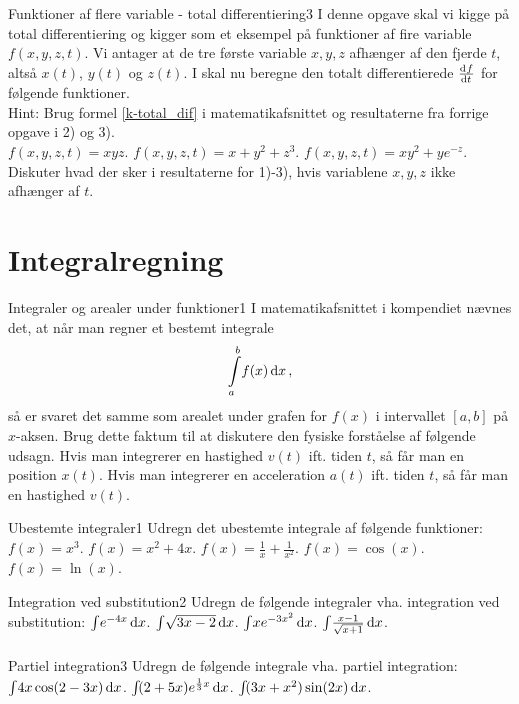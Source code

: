 \begin{opgave}{Funktioner af flere variable - total differentiering}{3}
	I denne opgave skal vi kigge på total differentiering og kigger som et eksempel på funktioner af fire variable $f(x,y,z,t)$. Vi antager at de tre første variable $x,y,z$ afhænger af den fjerde $t$, altså $x(t)$, $y(t)$ og $z(t)$. I skal nu beregne den totalt differentierede $\dif{t}{f}$ for følgende funktioner.\\
	Hint: Brug formel \eqref{k-total_dif} i matematikafsnittet og resultaterne fra forrige opgave i 2) og 3).\\
	\opg $f(x,y,z,t) = xyz.$ 
	\opg $f(x,y,z,t) = x +y^2 + z^3.$
	\opg $f(x,y,z,t) = x y^2 +  ye^{-z}.$
	\opg Diskuter hvad der sker i resultaterne for 1)-3), hvis variablene $x,y,z$ ikke afhænger af $t$. \\
\end{opgave}
\section*{Integralregning}
\begin{opgave}{Integraler og arealer under funktioner}{1}
I matematikafsnittet i kompendiet nævnes det, at når man regner et bestemt integrale
\begin{equation*}
\integral{f(x)}{x}{a}{b} \, ,
\end{equation*}
så er svaret det samme som arealet under grafen for $f(x)$ i intervallet $[a,b]$ på $x$-aksen. Brug dette faktum til at diskutere den fysiske forståelse af følgende udsagn.
\opg Hvis man integrerer en hastighed $v(t)$ ift. tiden $t$, så får man en position $x(t)$.
\opg Hvis man integrerer en acceleration $a(t)$ ift. tiden $t$, så får man en hastighed $v(t)$. \\
\end{opgave}
\begin{opgave}{Ubestemte integraler}{1}
	Udregn det ubestemte integrale af følgende funktioner:
	\opg $f(x) = x^3$.
	\opg $f(x) = x^2 + 4x$.
	\opg $f(x) = \frac{1}{x} + \frac{1}{x^2}$.
	\opg $f(x) = \cos (x)$.
	\opg $f(x) = \ln (x)$.
\end{opgave}
\begin{opgave}{Integration ved substitution}{2}
	Udregn de følgende integraler vha. integration ved substitution:
	\opg $\integral{e^{-4x}}{x}{}{}$.
	\opg $\integral{\sqrt{3x-2}}{x}{}{}$.
	\opg $\integral{xe^{-3x^2}}{x}{}{}$.
	\opg $\integral{\frac{x-1}{\sqrt{x+1}}}{x}{}{}$.
\end{opgave}
\begin{opgave}{Partiel integration}{3}
	Udregn de følgende integrale vha. partiel integration:
	\opg $\integral{4x\cos(2-3x)}{x}{}{}$.
	\opg $\integral{(2+5x)e^{\frac{1}{3}x}}{x}{}{}$.
	\opg $\integral{(3x+x^2)\sin (2x)}{x}{}{}$.
\end{opgave}
